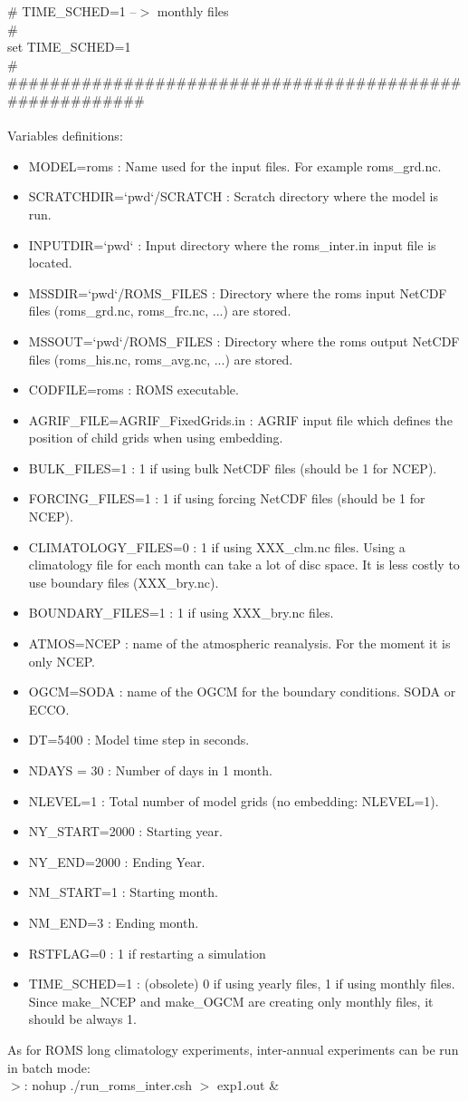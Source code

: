 \#                    TIME\_SCHED=1 --$>$ monthly files\\
\#\\
set TIME\_SCHED=1\\
\#\\
\#\#\#\#\#\#\#\#\#\#\#\#\#\#\#\#\#\#\#\#\#\#\#\#\#\#\#\#\#\#\#\#\#\#\#\#\#\#\#\#\#\#\#\#\#\#\#\#\#\#\#\#\#\#\#\#
\\
\\
Variables definitions:
\begin{itemize}
\item MODEL=roms : Name used for the input files. For example roms\_grd.nc.
\item SCRATCHDIR=`pwd`/SCRATCH : Scratch directory where the model is run.
\item INPUTDIR=`pwd` : Input directory where the roms\_inter.in input file
is located.
\item MSSDIR=`pwd`/ROMS\_FILES : Directory where the roms input NetCDF files
(roms\_grd.nc, roms\_frc.nc, ...) are stored.
\item MSSOUT=`pwd`/ROMS\_FILES : Directory where the roms output NetCDF files
(roms\_his.nc, roms\_avg.nc, ...) are stored.
\item CODFILE=roms : ROMS executable.
\item AGRIF\_FILE=AGRIF\_FixedGrids.in : AGRIF input file which defines the 
position of child grids when using embedding.
\item BULK\_FILES=1 : 1 if using bulk NetCDF files (should be 1 for NCEP).
\item FORCING\_FILES=1 : 1 if using forcing NetCDF files (should be 1 for NCEP).
\item CLIMATOLOGY\_FILES=0 : 1 if using XXX\_clm.nc files. Using a climatology
file for each month can take a lot of disc space. It is less costly to use
 boundary files (XXX\_bry.nc). 
\item BOUNDARY\_FILES=1 : 1 if using XXX\_bry.nc files. 
\item ATMOS=NCEP : name of the atmospheric reanalysis. For the moment it is only
NCEP.
\item OGCM=SODA : name of the OGCM for the boundary conditions. SODA or ECCO.
\item DT=5400 : Model time step in seconds.
\item NDAYS = 30 : Number of days in 1 month.
\item NLEVEL=1 : Total number of model grids (no embedding: NLEVEL=1).
\item NY\_START=2000 : Starting year.
\item NY\_END=2000 : Ending Year.
\item NM\_START=1 : Starting month.
\item NM\_END=3 : Ending month.
\item RSTFLAG=0 : 1 if restarting a simulation
\item TIME\_SCHED=1 : (obsolete) 0 if using yearly files, 1 if using monthly 
files. Since make\_NCEP and make\_OGCM are creating only monthly
files, it should be always 1.
\end{itemize}


As for ROMS long climatology experiments, inter-annual experiments can be run
in batch mode:\\
$>$: nohup ./run\_roms\_inter.csh $>$ exp1.out \&\\\\
